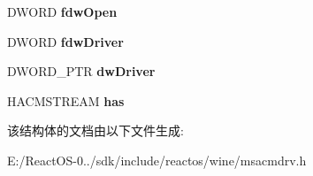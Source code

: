 \begin{DoxyCompactItemize}
\item 
\mbox{\label{struct___a_c_m_d_r_v_s_t_r_e_a_m_i_n_s_t_a_n_c_e_ad75d406ff35a9d6a5c0550882b3ae5d4}} 
D\+W\+O\+RD {\bfseries fdw\+Open}
\item 
\mbox{\label{struct___a_c_m_d_r_v_s_t_r_e_a_m_i_n_s_t_a_n_c_e_a45ab2eb521c03f8349d0b80f61bba32e}} 
D\+W\+O\+RD {\bfseries fdw\+Driver}
\item 
\mbox{\label{struct___a_c_m_d_r_v_s_t_r_e_a_m_i_n_s_t_a_n_c_e_afd4e29211eb37fa8e2c72e7e6f2cf2f6}} 
D\+W\+O\+R\+D\+\_\+\+P\+TR {\bfseries dw\+Driver}
\item 
\mbox{\label{struct___a_c_m_d_r_v_s_t_r_e_a_m_i_n_s_t_a_n_c_e_abb9f732934e6eb2bbe6a93fcda334b34}} 
H\+A\+C\+M\+S\+T\+R\+E\+AM {\bfseries has}
\end{DoxyCompactItemize}


该结构体的文档由以下文件生成\+:\begin{DoxyCompactItemize}
\item 
E\+:/\+React\+O\+S-\/0../sdk/include/reactos/wine/msacmdrv.\+h\end{DoxyCompactItemize}
